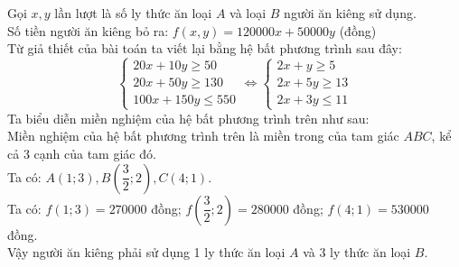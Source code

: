 \begin{bt}
{\begin{center}
	\end{center}
	Gọi $x, y$ lần lượt là số ly thức ăn loại $A$ và loại $B$ người ăn kiêng sử dụng.\\[0.15cm]
	Số tiền người ăn kiêng bỏ ra: $f(x, y)=120000 x+50000 y$ (đồng)\\[0.15cm]
	Từ giả thiết của bài toán ta viết lại bằng hệ bất phương trình sau đây:
	$$
	\left\{\begin{array} { l } 
		{ 2 0 x + 1 0 y \geq 5 0 } \\
		{ 2 0 x + 5 0 y \geq 1 3 0 } \\
		{ 1 0 0 x + 1 5 0 y \leq 5 5 0 }
	\end{array} \Leftrightarrow \left\{\begin{array}{l}
		2 x+y \geq 5 \\
		2 x+5 y \geq 13 \\
		2 x+3 y \leq 11
	\end{array}\right.\right.
	$$
	Ta biểu diễn miền nghiệm của hệ bất phương trình trên như sau:\\[0.15cm]
	Miền nghiệm của hệ bất phương trình trên là miền trong của tam giác $A B C$, kể cả 3 cạnh của tam giác đó.\\[0.15cm]
	Ta có: $A(1 ; 3), B\left(\dfrac{3}{2} ; 2\right), C(4 ; 1)$.\\[0.15cm]
	Ta có: $f(1 ; 3)=270000$ đồng; $f\left(\dfrac{3}{2} ; 2\right)=280000$ đồng; $f(4 ; 1)=530000$ đồng.\\[0.15cm]
	Vậy người ăn kiêng phải sử dụng 1 ly thức ăn loại $A$ và 3 ly thức ăn loại $B$.
	}
\end{bt}

